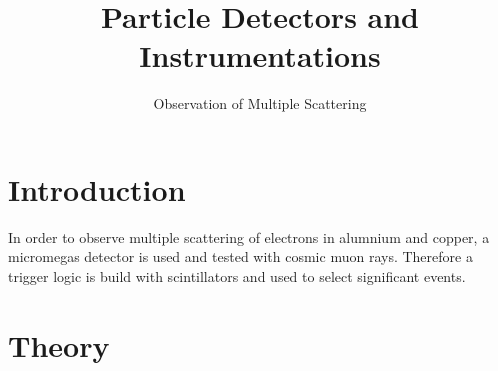 \documentclass[sn-mathphys-num,iicol]{sn-jnl}
\theoremstyle{thmstyleone}
\theoremstyle{thmstyletwo}
\theoremstyle{thmstylethree}
\begin{document}
        
\title[]{Particle Detectors and Instrumentations}
\subtitle{Observation of Multiple Scattering}
\author*[1]{ }
\author*[1]{ }

\maketitle

\section{Introduction}
In order to observe multiple scattering of electrons in alumnium and copper, a micromegas detector is used and tested with cosmic muon rays. Therefore a trigger logic is build with scintillators and used to select significant events.



\section{Theory}
\end{document}
